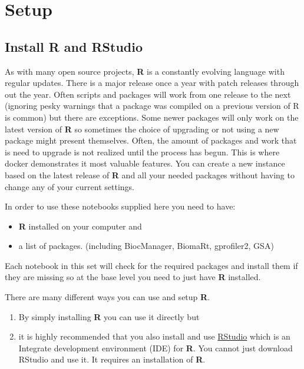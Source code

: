 \documentclass[
]{book}
\providecommand{\tightlist}{%
  \setlength{\itemsep}{0pt}\setlength{\parskip}{0pt}}
\begin{document}
\chapter{Setup}\label{setup}

\section{Install R and RStudio}\label{install-r-and-rstudio}

As with many open source projects, \textbf{R} is a constantly evolving language with regular updates. There is a major release once a year with patch releases through out the year. Often scripts and packages will work from one release to the next (ignoring pesky warnings that a package was compiled on a previous version of R is common) but there are exceptions. Some newer packages will only work on the latest version of \textbf{R} so sometimes the choice of upgrading or not using a new package might present themselves. Often, the amount of packages and work that is need to upgrade is not realized until the process has begun. This is where docker demonstrates it most valuable features. You can create a new instance based on the latest release of \textbf{R} and all your needed packages without having to change any of your current settings.

In order to use these notebooks supplied here you need to have:

\begin{itemize}
\tightlist
\item
  \textbf{R} installed on your computer and
\item
  a list of packages. (including BiocManager, BiomaRt, gprofiler2, GSA)
\end{itemize}

Each notebook in this set will check for the required packages and install them if they are missing so at the base level you need to just have \textbf{R} installed.

There are many different ways you can use and setup \textbf{R}.

\begin{enumerate}
\def\labelenumi{\arabic{enumi}.}
\tightlist
\item
  By simply installing \textbf{R} you can use it directly but
\item
  it is highly recommended that you also install and use \href{https://rstudio.com/products/rstudio/download/}{RStudio} which is an Integrate development environment (IDE) for \textbf{R}. You cannot just download RStudio and use it. It requires an installation of \textbf{R}.
\end{enumerate}
\end{document}
